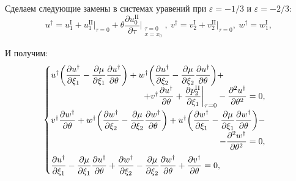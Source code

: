 \documentclass[../master.tex]{subfiles}
\begin{document}
Сделаем следующие замены в системах уравений при  $\varepsilon=-1/3$ и  $\varepsilon=-2/3$:
\[
 u^{\dagger} = u_1^{\text{I}} + u_1^{\text{II}}\big|_{ \tau=0} + \theta\dfrac{\partial u_0^{\text{II}}}{\partial \tau}\bigg|_{{\begin{smallmatrix} \tau=0 \\ x=x_0 \end{smallmatrix}}}, \
 v^{\dagger} = v_2^{\text{I}} + v_2^{\text{II}}\big|_{\tau=0}, \
 w^{\dagger} = w_1^{\text{I}},
\]

И получим: 
\begin{equation*}
	\begin{cases}
		u^{\dagger}\bigg(\dfrac{\partial u^{\dagger}}{\partial\xi_1} - \dfrac{\partial \mu}{\partial\xi_1}\dfrac{\partial u^{\dagger}}{\partial\theta} \bigg)+ w^{\dagger}\bigg(\dfrac{\partial u^{\dagger}}{\partial\xi_2} - \dfrac{\partial \mu}{\partial\xi_2}\dfrac{\partial u^{\dagger}}{\partial\theta} \bigg) + \\ 
		\quad \hfill +v^{\dagger}\dfrac{\partial u^{\dagger}}{\partial\theta} + \dfrac{\partial p_2^{\text{II}}}{\partial \xi_1}\bigg|_{\tau=0} -  \dfrac{\partial^2u^{\dagger}}{\partial\theta^2} =0, 
		\\[2ex]
		 v^{\dagger}\dfrac{\partial w^{\dagger}}{\partial\theta} + w^{\dagger} \bigg(\dfrac{\partial w^{\dagger}}{\partial\xi_2} - \dfrac{\partial \mu}{\partial\xi_2}\dfrac{\partial w^{\dagger}}{\partial\theta} \bigg) + u^{\dagger} \bigg(\dfrac{\partial w^{\dagger}}{\partial\xi_1} - \dfrac{\partial \mu}{\partial\xi_1}\dfrac{\partial w^{\dagger}}{\partial\theta} \bigg)-\\ \quad \hfill - \dfrac{\partial^2 w^\dagger}{\partial \theta^2}= 0,
		 \\[2ex]
		\dfrac{\partial u^{\dagger}}{\partial\xi_1} - \dfrac{\partial \mu}{\partial\xi_1}\dfrac{\partial u^{\dagger}}{\partial\theta} + \dfrac{\partial w^{\dagger}}{\partial\xi_2} - \dfrac{\partial \mu}{\partial\xi_2}\dfrac{\partial w^{\dagger}}{\partial\theta} + \dfrac{\partial v^{\dagger}}{\partial \theta} = 0,
	\end{cases}
\end{equation*}
\end{document}
